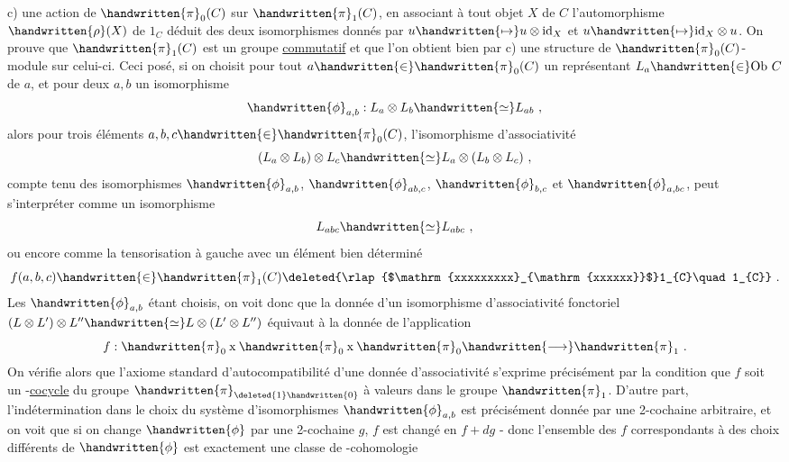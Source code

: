 c) une action de $\handwritten{\pi}_{0}(C)$ sur $\handwritten{\pi}_{1}(C)$, en associant à tout objet $X$ de $C$ l'automorphisme  $\handwritten{\rho}(X)$ de $1_C$ déduit des deux isomorphismes
donnés par $u\handwritten{\mapsto}u\otimes\mathrm{id}_{X}$ et $u\handwritten{\mapsto}\mathrm{id}_{X}\otimes u$. On prouve que $\handwritten{\pi}_{1}(C)$ est un groupe \uline{commutatif} et que l'on obtient bien par c) une structure de $\handwritten{\pi}_{0}(C)$-module sur celui-ci. Ceci posé, si on choisit pour tout $a\handwritten{\in}\handwritten{\pi}_{0}(C)$ un représentant $L_{a}\handwritten{\in}\mathrm{Ob}\ C$ de $a$, et pour deux  $a,b$ un isomorphisme
\[
\handwritten{\phi}_{a,b}: L_a\otimes L_b\handwritten{\simeq}L_{ab}\ ,
\]
alors pour trois éléments $a,b,c\handwritten{\in}\handwritten{\pi}_{0}(C)$, l'isomorphisme d'associativité
\[
(L_a\otimes L_b)\otimes L_c\handwritten{\simeq}L_a\otimes(L_b\otimes L_c)\ ,
\]
compte tenu des isomorphismes $\handwritten{\phi}_{a,b}$, $\handwritten{\phi}_{ab,c}$, $\handwritten{\phi}_{b,c}$ et $\handwritten{\phi}_{a,bc}$, peut s'interpréter comme un isomorphisme
\[
L_{abc}\handwritten{\simeq}L_{abc}\ ,
\]
ou encore comme la tensorisation à gauche avec un élément bien déterminé
\[
f(a,b,c)\handwritten{\in}\handwritten{\pi}_{1}(C)\deleted{\rlap{$\mathrm{xxxxxxxxx}_{\mathrm{xxxxxx}}$}1_{C}\quad 1_{C}}\ .
\]
Les $\handwritten{\phi}_{a,b}$ étant choisis, on voit donc que la donnée d'un isomorphisme d'associativité fonctoriel $(L\otimes L')\otimes L''\handwritten{\simeq}L\otimes(L'\otimes L'')$ équivaut à la donnée de l'application
\[
f:\handwritten{\pi}_{0}\mathbin{\mathrm{x}}\handwritten{\pi}_{0}\mathbin{\mathrm{x}}\handwritten{\pi}_{0}\handwritten{\longrightarrow}\handwritten{\pi}_{1}\ .
\]
On vérifie alors que l'axiome  standard d'autocompatibilité d'une donnée d'associativité  s'exprime précisément par la condition que $f$ soit un -\uline{cocycle} du groupe $\handwritten{\pi}_{\deleted{1}\handwritten{0}}$ à valeurs dans le groupe $\handwritten{\pi}_{1}$. D'autre part, l'indétermination dans le choix du système d'isomorphismes $\handwritten{\phi}_{a,b}$ est précisément donnée par une 2-cochaine arbitraire, et on voit que si on change $\handwritten{\phi}$ par une 2-cochaine $g$, $f$ est changé en $f+dg$ - donc l'ensemble des $f$ correspondants à des choix différents de $\handwritten{\phi}$ est exactement une classe de -cohomologie
